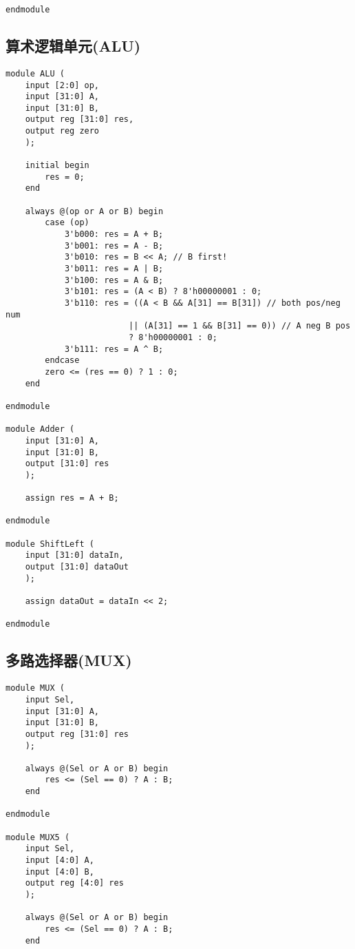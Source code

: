 \begin{multicols}{2}
\begin{lstlisting}
endmodule
\end{lstlisting}

\subsection{算术逻辑单元(ALU)}
\begin{lstlisting}
module ALU (
    input [2:0] op,
    input [31:0] A,
    input [31:0] B,
    output reg [31:0] res,
    output reg zero
    );
    
    initial begin
        res = 0;
    end
    
    always @(op or A or B) begin
        case (op)
            3'b000: res = A + B;
            3'b001: res = A - B;
            3'b010: res = B << A; // B first!
            3'b011: res = A | B;
            3'b100: res = A & B;
            3'b101: res = (A < B) ? 8'h00000001 : 0;
            3'b110: res = ((A < B && A[31] == B[31]) // both pos/neg num
                         || (A[31] == 1 && B[31] == 0)) // A neg B pos
                         ? 8'h00000001 : 0;
            3'b111: res = A ^ B;
        endcase
        zero <= (res == 0) ? 1 : 0;
    end

endmodule

module Adder (
    input [31:0] A,
    input [31:0] B,
    output [31:0] res
    );

    assign res = A + B;

endmodule

module ShiftLeft (
    input [31:0] dataIn,
    output [31:0] dataOut
    );
    
    assign dataOut = dataIn << 2;

endmodule
\end{lstlisting}

\subsection{多路选择器(MUX)}
\begin{lstlisting}
module MUX (
    input Sel,
    input [31:0] A,
    input [31:0] B,
    output reg [31:0] res
    );
    
    always @(Sel or A or B) begin
        res <= (Sel == 0) ? A : B;
    end

endmodule

module MUX5 (
    input Sel,
    input [4:0] A,
    input [4:0] B,
    output reg [4:0] res
    );
    
    always @(Sel or A or B) begin
        res <= (Sel == 0) ? A : B;
    end


\end{lstlisting}
\end{multicols}
